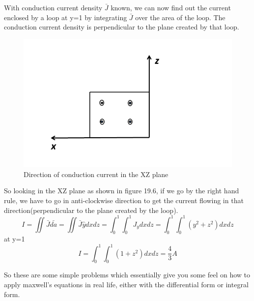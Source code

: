 \begin{example}
With conduction current density $\bar{J}$ known, we can now find out the current enclosed by a loop at y=1 by integrating $\bar{J}$ over the area of the loop. The conduction current density is perpendicular to the plane created by that loop.
\begin{figure}[h]
\centering
\includegraphics[width=1\linewidth]{./graphics/problemXZplane}
\caption{Direction of conduction current in the XZ plane}
\end{figure} 
So looking in the XZ plane as shown in figure 19.6, if we go by the right hand rule, we have to go in anti-clockwise direction to get the current flowing in that direction(perpendicular to the plane created by the loop).
\begin{dmath*}
I=\iint\bar{J}\bar{da}=\iint\bar{J}\hat{y}dxdz
=\int_{0}^{1}\int_{0}^{1}J_{y}dxdz
=\int_{0}^{1}\int_{0}^{1}(y^{2}+z^{2})dxdz
\end{dmath*}
at y=1
\begin{dmath*}
I=\int_{0}^{1}\int_{0}^{1}(1+z^{2})dxdz
= \frac{4}{3}A
\end{dmath*}
\end{example}
So these are some simple problems which essentially give you some feel on how to apply maxwell's equations in real life, either with the differential form or integral form.